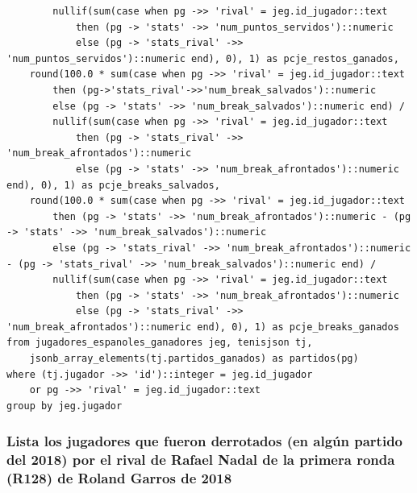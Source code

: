 \documentclass[11pt]{opticajnl}
\begin{document}
\begin{verbatim}
    	nullif(sum(case when pg ->> 'rival' = jeg.id_jugador::text 
    		then (pg -> 'stats' ->> 'num_puntos_servidos')::numeric 
    		else (pg -> 'stats_rival' ->> 'num_puntos_servidos')::numeric end), 0), 1) as pcje_restos_ganados,
    round(100.0 * sum(case when pg ->> 'rival' = jeg.id_jugador::text 
    	then (pg->'stats_rival'->>'num_break_salvados')::numeric 
    	else (pg -> 'stats' ->> 'num_break_salvados')::numeric end) / 
    	nullif(sum(case when pg ->> 'rival' = jeg.id_jugador::text 
    		then (pg -> 'stats_rival' ->> 'num_break_afrontados')::numeric 
    		else (pg -> 'stats' ->> 'num_break_afrontados')::numeric end), 0), 1) as pcje_breaks_salvados,
    round(100.0 * sum(case when pg ->> 'rival' = jeg.id_jugador::text 
    	then (pg -> 'stats' ->> 'num_break_afrontados')::numeric - (pg -> 'stats' ->> 'num_break_salvados')::numeric
    	else (pg -> 'stats_rival' ->> 'num_break_afrontados')::numeric - (pg -> 'stats_rival' ->> 'num_break_salvados')::numeric end) / 
    	nullif(sum(case when pg ->> 'rival' = jeg.id_jugador::text 
    		then (pg -> 'stats' ->> 'num_break_afrontados')::numeric 
    		else (pg -> 'stats_rival' ->> 'num_break_afrontados')::numeric end), 0), 1) as pcje_breaks_ganados
from jugadores_espanoles_ganadores jeg, tenisjson tj, 
	jsonb_array_elements(tj.partidos_ganados) as partidos(pg)
where (tj.jugador ->> 'id')::integer = jeg.id_jugador 
	or pg ->> 'rival' = jeg.id_jugador::text
group by jeg.jugador
\end{verbatim}





\subsubsection{Lista los jugadores que fueron derrotados (en algún partido del 2018) por el rival de Rafael Nadal de la primera ronda (R128) de Roland Garros de 2018}
\end{document}
